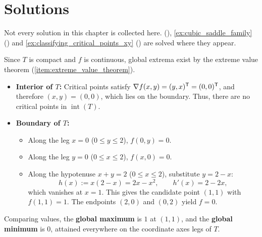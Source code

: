 
\section{Solutions}
\label{sec:extrema_solutions}

Not every solution in this chapter is collected here. 
(), \cref{ex:cubic_saddle_family}
() and \cref{ex:classifying_critical_points_xy}
() are solved where they appear.

\begin{exercisesolution}
\label{sol:ai_extrema_triangle}
Since $T$ is compact and $f$ is continuous, global extrema exist by the extreme value theorem
(\cref{item:extreme_value_theorem}).
\begin{itemize}
  \item \textbf{Interior of $T$:} Critical points satisfy $\nabla f(x,y) = (y,x)^{\mathsf{T}} = (0,0)^{\mathsf{T}}$, and therefore $(x,y) = (0,0)$, which lies on the boundary. Thus, there are no critical points in $\operatorname{int}(T)$.
  \item \textbf{Boundary of $T$:}
    \begin{itemize}
      \item Along the leg $x = 0$ ($0 \le y \le 2$), $f(0,y) = 0$.
      \item Along the leg $y = 0$ ($0 \le x \le 2$), $f(x,0) = 0$.
      \item Along the hypotenuse $x+y = 2$ ($0 \le x \le 2$), substitute $y = 2-x$:
        \[h(x) := x(2-x) = 2x-x^2, \qquad h'(x) = 2-2x,\]
        which vanishes at $x = 1$. This gives the candidate point $(1,1)$ with $f(1,1) = 1$. The endpoints $(2,0)$ and $(0,2)$ yield $f = 0$.
    \end{itemize}
\end{itemize}
Comparing values, the \textbf{global maximum} is $1$ at $(1,1)$, and the \textbf{global minimum} is $0$, attained everywhere on the coordinate axes legs of $T$.
\end{exercisesolution}

